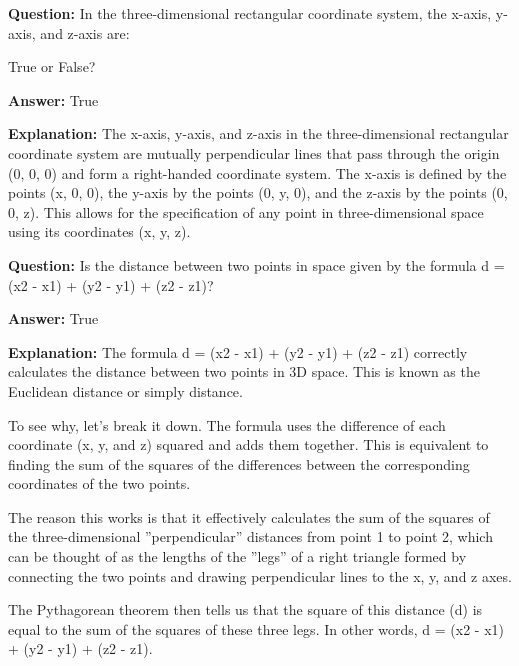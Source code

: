 \documentclass{article}
\begin{document}
                \vspace{0.5cm} 
        
            
                \textbf {Question:} In the three-dimensional rectangular coordinate system, the x-axis, y-axis, and z-axis are:

True or False?
                
                \textbf{Answer:} True

                \textbf{Explanation:} The x-axis, y-axis, and z-axis in the three-dimensional rectangular coordinate system are mutually perpendicular lines that pass through the origin (0, 0, 0) and form a right-handed coordinate system. The x-axis is defined by the points (x, 0, 0), the y-axis by the points (0, y, 0), and the z-axis by the points (0, 0, z). This allows for the specification of any point in three-dimensional space using its coordinates (x, y, z).
                
                \vspace{0.5cm} 
        
            
                \textbf {Question:} Is the distance between two points in space given by the formula d = (x2 - x1){\texttwosuperior} + (y2 - y1){\texttwosuperior} + (z2 - z1){\texttwosuperior}?
                
                \textbf{Answer:} True

                \textbf{Explanation:} The formula d = (x2 - x1){\texttwosuperior} + (y2 - y1){\texttwosuperior} + (z2 - z1){\texttwosuperior} correctly calculates the distance between two points in 3D space. This is known as the Euclidean distance or simply distance.

To see why, let's break it down. The formula uses the difference of each coordinate (x, y, and z) squared and adds them together. This is equivalent to finding the sum of the squares of the differences between the corresponding coordinates of the two points.

The reason this works is that it effectively calculates the sum of the squares of the three-dimensional ''perpendicular'' distances from point 1 to point 2, which can be thought of as the lengths of the ''legs'' of a right triangle formed by connecting the two points and drawing perpendicular lines to the x, y, and z axes.

The Pythagorean theorem then tells us that the square of this distance (d) is equal to the sum of the squares of these three legs. In other words, d{\texttwosuperior} = (x2 - x1){\texttwosuperior} + (y2 - y1){\texttwosuperior} + (z2 - z1){\texttwosuperior}.
\end{document}
